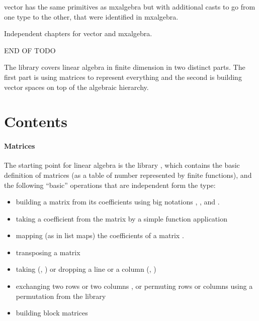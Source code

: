 vector has the same primitives as mxalgebra but with additional casts
to go from one type to the other, that were identified in mxalgebra.


Independent chapters for vector and mxalgebra.

END OF TODO








The library covers linear algebra in finite dimension in two distinct
parts. The first part is using matrices to represent everything and
the second is building vector spaces on top of the algebraic
hierarchy.



\newcommand{\idmat}{\ensuremath{\mathbb{I}}}

\section{Contents}

\paragraph{Matrices}

The starting point for linear algebra is the library
, which contains the basic definition of matrices
(as a table of number represented by finite functions), and the
following ``basic'' operations that are independent form the type:
\begin{itemize}
\item building a matrix from its coefficients using big notations
  , ,  and .
\item taking a coefficient from the matrix by a simple function
  application 
\item mapping (as in list maps) the coefficients of a matrix
  .
\item transposing a matrix 
\item taking (, ) or dropping a line or a column
  (, )
\item exchanging two rows  or two columns , or
  permuting rows  or columns  using a
  permutation from the library 
\item building block matrices
\end{itemize}

